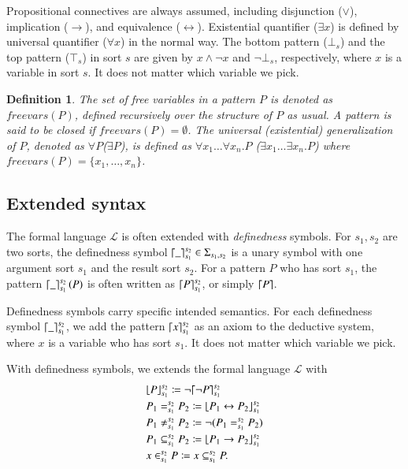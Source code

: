 \documentclass{article}
\theoremstyle{plain}
\newtheorem{defn}[thm]{Definition}
\DeclarePairedDelimiter\ceil{\lceil}{\rceil}
\DeclarePairedDelimiter\floor{\lfloor}{\rfloor}
\def\imp{\rightarrow}
\def\fv{\textit{freevars}}
\begin{document}
Propositional connectives are always assumed, including disjunction ($\vee$), implication ($\imp$), and equivalence ($\leftrightarrow$). Existential quantifier ($\exists x$) is defined by universal quantifier ($\forall x$) in the normal way. The bottom pattern ($\bot_s$) and the top pattern ($\top_s$) in sort $s$ are given by $x \wedge \neg x$ and $\neg \bot_s$, respectively, where $x$ is a variable in sort $s$. It does not matter which variable we pick.

\begin{defn}
	The set of free variables in a pattern $P$ is denoted as $\fv(P)$, defined recursively over the structure of $P$ as usual. A pattern is said to be \emph{closed} if $\fv(P) = \emptyset$. The universal (existential) generalization of $P$, denoted as $\forall P$($\exists P$), is defined as $\forall x_1 \dots \forall x_n . P$ ($\exists x_1 \dots \exists x_n . P$) where $\fv(P) = \{x_1,\dots,x_n\}$.
\end{defn}


\subsection{Extended syntax}
The formal language $\mathcal{L}$ is often extended with \emph{definedness} symbols. For $s_1, s_2$ are two sorts, the definedness symbol $\ceil*{\_}_{s_1}^{s_2} \in \Sigma_{s_1,s_2}$ is a unary symbol with one argument sort $s_1$ and the result sort $s_2$. For a pattern $P$ who has sort $s_1$, the pattern $\ceil*{\_}_{s_1}^{s_2} \left(P\right)$ is often written as $\ceil*{P}_{s_1}^{s_2}$, or simply $\ceil*{P}$.

Definedness symbols carry specific intended semantics. For each definedness symbol $\ceil*{\_}_{s_1}^{s_2}$, we add the pattern $\ceil*{x}_{s_1}^{s_2}$ as an axiom to the deductive system, where $x$ is a variable who has sort $s_1$. It does not matter which variable we pick.

With definedness symbols, we extends the formal language $\mathcal{L}$ with 
\begin{align*}
&\floor*{P}_{s_1}^{s_2} \coloneqq {\neg} \ceil*{\neg P}_{s_1}^{s_2} \\
&P_1 =_{s_1}^{s_2} P_2 \coloneqq \floor*{P_1 \leftrightarrow P_2}_{s_1}^{s_2} \\
&P_1 \neq_{s_1}^{s_2} P_2 \coloneqq \neg (P_1 =_{s_1}^{s_2} P_2) \\
&P_1 \subseteq_{s_1}^{s_2} P_2 \coloneqq \floor*{P_1 \imp P_2}_{s_1}^{s_2} \\
&x \in_{s_1}^{s_2} P \coloneqq x \subseteq_{s_1}^{s_2} P.
\end{align*}
\end{document}
